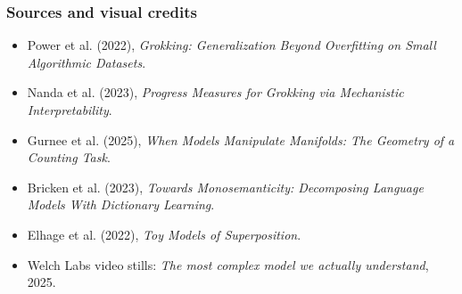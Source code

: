 \documentclass[aspectratio=169]{beamer}
\begin{document}
\begin{frame}
\frametitle{Sources and visual credits}
\small
\begin{itemize}\setlength\itemsep{0.40em}
\item Power et al. (2022), \textit{Grokking: Generalization Beyond Overfitting on Small Algorithmic Datasets}.
\item Nanda et al. (2023), \textit{Progress Measures for Grokking via Mechanistic Interpretability}.
\item Gurnee et al. (2025), \textit{When Models Manipulate Manifolds: The Geometry of a Counting Task}.
\item Bricken et al. (2023), \textit{Towards Monosemanticity: Decomposing Language Models With Dictionary Learning}.
\item Elhage et al. (2022), \textit{Toy Models of Superposition}.
\item Welch Labs video stills: \textit{The most complex model we actually understand}, 2025.
\end{itemize}
\end{frame}
\end{document}
